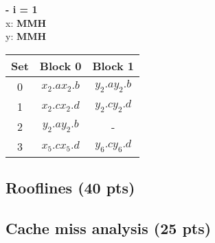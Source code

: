 \begin{enumerate}[label=\roman*. ]
    \textbf{- i = 1}\\
    x: \textbf{MMH}\\
    y: \textbf{MMH}
    \begin{table}[h!]
        \begin{tabular}{|c|c|c|}
        Set & Block 0 & Block 1 \\ \hline
        0 & $x_2.a$\quad$x_2.b$ & $y_2.a$\quad$y_2.b$ \\ \hline
        1 & $x_2.c$\quad$x_2.d$ & $y_2.c$\quad$y_2.d$ \\ \hline
        2 & $y_2.a$\quad$y_2.b$ & - \\ \hline
        3 & $x_5.c$\quad$x_5.d$ & $y_6.c$\quad$y_6.d$ \\ \hline
        \end{tabular}
        \end{table}
\end{enumerate}
\subsection{Rooflines (40 pts)}


\subsection{Cache miss analysis (25 pts)}

